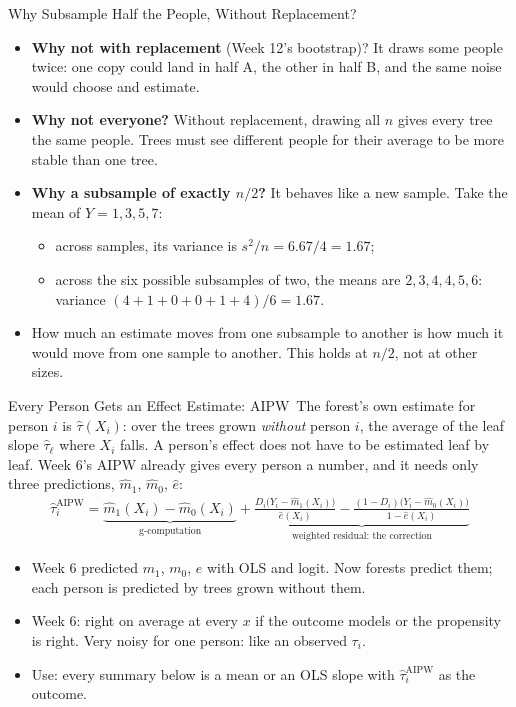 \documentclass[aspectratio=169,11pt,xcolor=dvipsnames]{beamer}
\newcommand{\core}{\,\raisebox{0.6pt}{\textcolor{corestar}{$\bigstar$}}}
\begin{document}
\begin{frame}{Why Subsample Half the People, Without Replacement?}
\begin{itemize}\itemsep6pt
  \item \textbf{Why not with replacement} (Week 12's bootstrap)? It draws some people twice: one copy
        could land in half A, the other in half B, and the same noise would choose and estimate.
  \item \textbf{Why not everyone?} Without replacement, drawing all $n$ gives every tree the same
        people. Trees must see different people for their average to be more stable than one tree.
  \item \textbf{Why a subsample of exactly $n/2$?} It behaves like a new sample. Take the mean of
        $Y = 1, 3, 5, 7$:
  \begin{itemize}\itemsep2pt
    \item across samples, its variance is $s^2/n = 6.67/4 = 1.67$;
    \item across the six possible subsamples of two, the means are $2, 3, 4, 4, 5, 6$: variance
          $(4 + 1 + 0 + 0 + 1 + 4)/6 = 1.67$.
  \end{itemize}
  \item How much an estimate moves from one subsample to another is how much it would move from
        one sample to another. This holds at $n/2$, not at other sizes.
\end{itemize}
\end{frame}

\begin{frame}{Every Person Gets an Effect Estimate: AIPW\core}
The forest's own estimate for person $i$ is $\hat\tau(X_i)$: over the trees grown \emph{without} person $i$,
the average of the leaf slope $\hat\tau_\ell$ where $X_i$ falls.
\vskip4pt
A person's effect does not have to be estimated leaf by leaf. Week 6's AIPW already gives every person a
number, and it needs only three predictions, $\hat m_1$, $\hat m_0$, $\hat e$:
\begin{align*}
  \hat\tau_i^{\text{AIPW}} = \underbrace{\hat m_1(X_i) - \hat m_0(X_i)}_{\text{g-computation}}
  + \underbrace{\frac{D_i\big(Y_i - \hat m_1(X_i)\big)}{\hat e(X_i)}
  - \frac{(1-D_i)\big(Y_i - \hat m_0(X_i)\big)}{1 - \hat e(X_i)}}_{\text{weighted residual: the correction}}
\end{align*}
\vskip-4pt
\begin{itemize}\itemsep3pt
  \item Week 6 predicted $m_1$, $m_0$, $e$ with OLS and logit. Now forests predict them; each person is
        predicted by trees grown without them.
  \item Week 6: right on average at every $x$ if the outcome models or the propensity is right. Very noisy
        for one person: like an observed $\tau_i$.
  \item \alert{Use}: every summary below is a mean or an OLS slope with $\hat\tau_i^{\text{AIPW}}$ as the outcome.
\end{itemize}
\end{frame}
\end{document}
